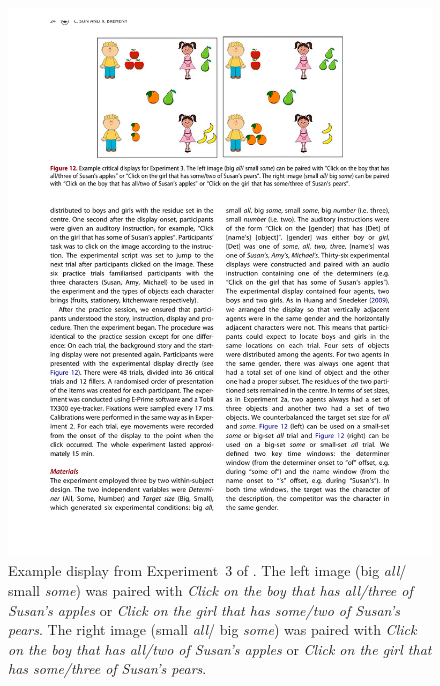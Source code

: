 \documentclass[10pt,letterpaper]{article}
\newcommand{\expref}[1]{Experiment~#1}
\begin{document}
\begin{figure}[H]
\centering
\includegraphics[width=\columnwidth]{images/display}
\caption{Example display from \expref{3} of . The left image (big \emph{all}/ small  \emph{some}) was paired with  \emph{Click on the boy that has all/three of Susan's apples} or  \emph{Click on the girl that has some/two of Susan's pears}. The right image (small  \emph{all}/ big  \emph{some}) was paired with  \emph{Click on the boy that has all/two of Susan's apples} or  \emph{Click on the girl that has some/three of Susan's pears}.} 
\label{fig:display}
\end{figure}
\end{document}
